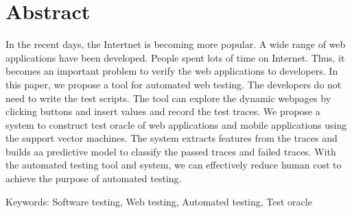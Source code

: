 
\chapter{Abstract}

In the recent days, the Intertnet is becoming more popular.
A wide range of web applications have been developed.
People spent lots of time on Internet.
Thus, it becomes an important problem to verify the web applications to developers.
In this paper, we propose a tool for automated web testing.
The developers do not need to write the test scripts.
The tool can explore the dynamic webpages by clicking buttons and insert values and record the test traces.
We propose a system to construct test oracle of web applications and mobile applications using the support vector machines.
The system extracts features from the traces and builds aa predictive model to classify the passed traces and failed traces.
With the automated testing tool and system,
we can effectively reduce human cost to achieve the purpose of automated testing.

\;\;
Keywords: Software testing, Web testing, Automated testing, Test oracle
